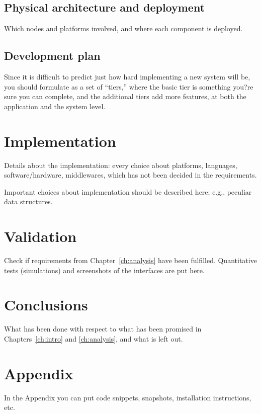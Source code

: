 \documentclass{memoir}
\begin{document}
\section{Physical architecture and deployment}
Which nodes and platforms involved, and where each component is deployed.

\section{Development plan}
Since it is difficult to predict just how hard implementing a new system will be, you should formulate as a set of ``tiers,'' where the basic tier is something you?re sure you can complete, and the additional tiers add more features, at both the application and the system level.

\chapter{Implementation}

Details about the implementation: every choice about platforms, languages, software/hardware, middlewares, which has not been decided in the requirements.


Important choices about implementation should be described here; e.g., peculiar data structures.


\chapter{Validation}

Check if requirements from Chapter~\ref{ch:analysis} have been fulfilled.
Quantitative tests (simulations) and screenshots of the interfaces are put here.


\chapter{Conclusions}

What has been done with respect to what has been promised in Chapters~\ref{ch:intro} and \ref{ch:analysis}, and what is left out.

\appendix

\chapter{Appendix}

In the Appendix you can put code snippets, snapshots, installation instructions, etc.
\end{document}
